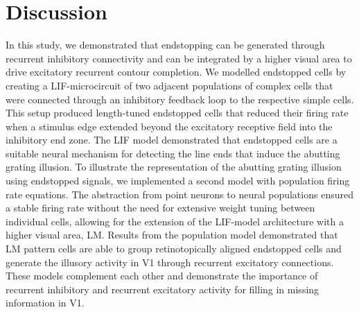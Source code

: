 \documentclass[12pt]{article}
\begin{document}
\section*{Discussion}
\setlength{\parindent}{24pt} 
In this study, we demonstrated that endstopping can be generated through recurrent inhibitory connectivity and can be integrated by a higher visual area to drive excitatory recurrent contour completion. We modelled endstopped cells by creating a LIF-microcircuit of two adjacent populations of complex cells that were connected through an inhibitory feedback loop to the respective simple cells. This setup produced length-tuned endstopped cells that reduced their firing rate when a stimulus edge extended beyond the excitatory receptive field into the inhibitory end zone. The LIF model demonstrated that endstopped cells are a suitable neural mechanism for detecting the line ends that induce the abutting grating illusion. To illustrate the representation of the abutting grating illusion using endstopped signals, we implemented a second model with population firing rate equations. The abstraction from point neurons to neural populations ensured a stable firing rate without the need for extensive weight tuning between individual cells, allowing for the extension of the LIF-model architecture with a higher visual area, LM. Results from the population model demonstrated that LM pattern cells are able to group retinotopically aligned endstopped cells and generate the illusory activity in V1 through recurrent excitatory connections. These models complement each other and demonstrate the importance of recurrent inhibitory and recurrent excitatory activity for filling in missing information in V1. 
\setlength{\parindent}{0pt}
\bigbreak
\end{document}

